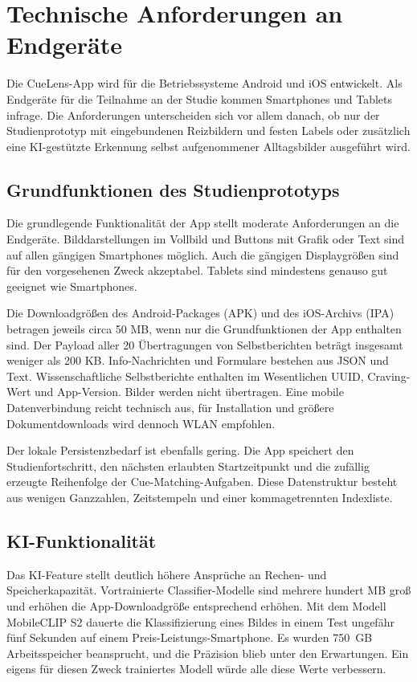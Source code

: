 

\chapter{Technische Anforderungen an Endgeräte}
Die CueLens-App wird für die Betriebssysteme Android und iOS entwickelt. Als Endgeräte für die Teilnahme an der Studie kommen Smartphones und Tablets infrage. Die Anforderungen unterscheiden sich vor allem danach, ob nur der Studienprototyp mit eingebundenen Reizbildern und festen Labels oder zusätzlich eine KI-gestützte Erkennung selbst aufgenommener Alltagsbilder ausgeführt wird.

\section{Grundfunktionen des Studienprototyps}
Die grundlegende Funktionalität der App stellt moderate Anforderungen an die Endgeräte. Bilddarstellungen im Vollbild und Buttons mit Grafik oder Text sind auf allen gängigen Smartphones möglich. Auch die gängigen Displaygrößen sind für den vorgesehenen Zweck akzeptabel. Tablets sind mindestens genauso gut geeignet wie Smartphones.

Die Downloadgrößen des Android-Packages (APK) und des iOS-Archivs (IPA) betragen jeweils circa 50 MB, wenn nur die Grundfunktionen der App enthalten sind. Der Payload aller 20 Übertragungen von Selbstberichten beträgt insgesamt weniger als 200 KB. Info-Nachrichten und Formulare bestehen aus JSON und Text. Wissenschaftliche Selbstberichte enthalten im Wesentlichen UUID, Craving-Wert und App-Version. Bilder werden nicht übertragen. Eine mobile Datenverbindung reicht technisch aus, für Installation und größere Dokumentdownloads wird dennoch WLAN empfohlen.

Der lokale Persistenzbedarf ist ebenfalls gering. Die App speichert den Studienfortschritt, den nächsten erlaubten Startzeitpunkt und die zufällig erzeugte Reihenfolge der Cue-Matching-Auf\-gaben. Diese Datenstruktur besteht aus wenigen Ganzzahlen, Zeitstempeln und einer kommagetrennten Indexliste.

\section{KI-Funktionalität}
Das KI-Feature stellt deutlich höhere Ansprüche an Rechen- und Speicherkapazität. Vortrainierte Classifier-Modelle sind mehrere hundert MB groß und erhöhen die App-Downloadgröße entsprechend erhöhen. Mit dem Modell MobileCLIP S2 dauerte die Klassifizierung eines Bildes in einem Test ungefähr fünf Sekunden auf einem Preis-Leistungs-Smartphone. Es wurden 750~GB Arbeitsspeicher beansprucht, und die Präzision blieb unter den Erwartungen. Ein eigens für diesen Zweck trainiertes Modell würde alle diese Werte verbessern.

